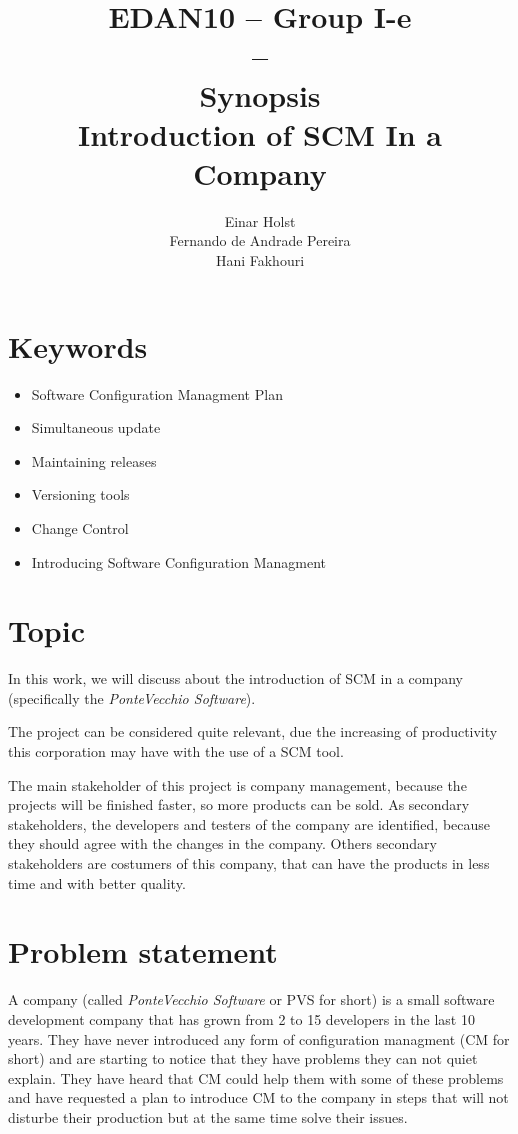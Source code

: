 \documentclass[a4paper]{article}
\title{EDAN10 -- Group I-e\\--\\ Synopsis \\
Introduction of SCM In a Company 
}
\author{Einar Holst \\
Fernando de Andrade Pereira \\
Hani Fakhouri
}
\begin{document}
\maketitle
\thispagestyle{empty}
\clearpage

\tableofcontents
\thispagestyle{empty}
\clearpage

\setcounter{page}{1}

\section{Keywords}
\begin{itemize}
\item Software Configuration Managment Plan
\item Simultaneous update
\item Maintaining releases
\item Versioning tools
\item Change Control
\item Introducing Software Configuration Managment
\end{itemize}


\section{Topic}
In this work, we will discuss about the introduction of SCM in a company (specifically the \emph{PonteVecchio Software}).

The project can be considered quite relevant, due the increasing of productivity this corporation may have with the use of a SCM tool.

The main stakeholder of this project is company management, because the projects will be finished faster, so more products can be sold. 
As secondary stakeholders, the developers and testers of the company are identified, because they should agree with the changes in the company.
Others secondary stakeholders are costumers of this company, that can have the products in less time and with better quality.

\section{Problem statement}
A company (called \emph{PonteVecchio Software} or PVS for short) is a small software development company that has grown from 2 to 15 developers in the last 10 years. They have never introduced any form of configuration managment (CM for short) and are starting to notice that they have problems they can not quiet explain. They have heard that CM could help them with some of these problems and have requested a plan to introduce CM to the company in steps that will not disturbe their production but at the same time solve their issues.
\end{document}
